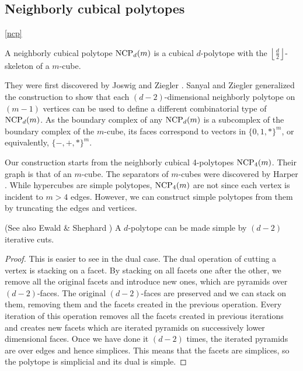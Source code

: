 \subsection{Neighborly cubical polytopes}
\ref{ncp}

\begin{definition}
A neighborly cubical polytope $\textrm{NCP}_d(m)$ is a cubical $d$-polytope with the $\left\lfloor \frac{d}{2} 
\right\rfloor$-skeleton of a $m$-cube.
\end{definition}

They were first discovered by Joswig and Ziegler \cite{Z62}. Sanyal and Ziegler \cite{Z102}
generalized the construction to show that each $(d-2)$-dimensional neighborly 
polytope on $(m-1)$ vertices can be used to define a 
different combinatorial type of $\textrm{NCP}_d(m)$. As the boundary complex of any $\textrm{NCP}_d(m)$
is a subcomplex of the boundary complex of the $m$-cube, its faces correspond to vectors
in $\{0,1,*\}^m$, or equivalently, $\{-,+,*\}^m$.


Our construction starts from the neighborly cubical 4-polytopes $\textrm{NCP}_4(m)$. 
Their graph is that of an $m$-cube. The separators of $m$-cubes were discovered by Harper 
\cite{Harp}.
While hypercubes are simple polytopes, $\textrm{NCP}_4(m)$ are not since each vertex is 
incident to $m>4$ edges. However, we can construct simple polytopes from them by 
truncating the edges and vertices.

 

\begin{lemma}
(See also Ewald \& Shephard \cite{EwSh}) A $d$-polytope can be made simple 
by $(d-2)$ iterative cuts.
\end{lemma}

\begin{proof}
This is easier to see in the dual case. The dual operation of cutting a vertex 
is stacking on a facet. By stacking on all facets one after the other, we 
remove all the original facets and introduce new ones, which are pyramids over 
$(d-2)$-faces. The original $(d-2)$-faces are preserved and we can stack on 
them, removing them and the facets created in the previous operation. Every 
iteration of this operation removes all the facets created in previous 
iterations and creates new facets which are iterated pyramids on successively 
lower dimensional faces. Once we have done it $(d-2)$ times, the iterated 
pyramids are over edges and hence simplices. This means that the facets are 
simplices, so the polytope is simplicial and its dual is simple.
\end{proof}

